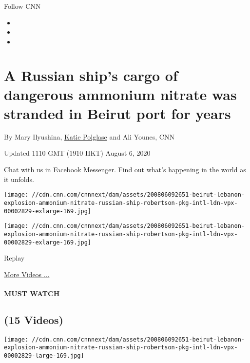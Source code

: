 Follow CNN

\begin{itemize}
\item
\item
\item
\end{itemize}

\hypertarget{a-russian-ships-cargo-of-dangerous-ammonium-nitrate-was-stranded-in-beirut-port-for-years}{%
\section{A Russian ship's cargo of dangerous ammonium nitrate was
stranded in Beirut port for
years}\label{a-russian-ships-cargo-of-dangerous-ammonium-nitrate-was-stranded-in-beirut-port-for-years}}

By Mary Ilyushina, \href{/profiles/katie-polglase}{Katie Polglase} and
Ali Younes, CNN

Updated 1110 GMT (1910 HKT) August 6, 2020

Chat with us in Facebook Messenger. Find out what's happening in the
world as it unfolds.

\texttt{[image: //cdn.cnn.com/cnnnext/dam/assets/200806092651-beirut-lebanon-explosion-ammonium-nitrate-russian-ship-robertson-pkg-intl-ldn-vpx-00002829-exlarge-169.jpg]}

\texttt{[image: //cdn.cnn.com/cnnnext/dam/assets/200806092651-beirut-lebanon-explosion-ammonium-nitrate-russian-ship-robertson-pkg-intl-ldn-vpx-00002829-exlarge-169.jpg]}\href{javascript:void(0);}{}

Replay

\href{/videos}{More Videos ...}

\hypertarget{must-watch}{%
\paragraph{MUST WATCH}\label{must-watch}}

\hypertarget{15-videos}{%
\subsection{(15 Videos)}\label{15-videos}}

\href{/videos/world/2020/08/06/beirut-lebanon-explosion-ammonium-nitrate-russian-ship-robertson-pkg-intl-ldn-vpx.cnn/video/playlists/around-the-world/}{}

\texttt{[image: //cdn.cnn.com/cnnnext/dam/assets/200806092651-beirut-lebanon-explosion-ammonium-nitrate-russian-ship-robertson-pkg-intl-ldn-vpx-00002829-large-169.jpg]}


